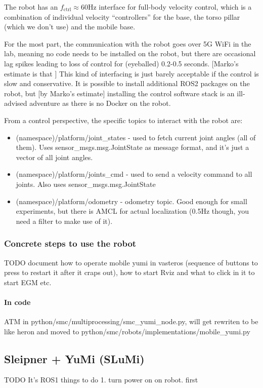 The robot has an $f_{ \text{ctrl} } \approx  $60Hz interface for full-body velocity control,
which is a combination of individual velocity ``controllers'' for the base, 
the torso pillar (which we don't use) and the mobile base.

For the most part, the communication with the robot goes over 5G WiFi in the lab,
meaning no code needs to be installed on the robot, but there are occasional lag spikes
leading to loss of control for (eyeballed) 0.2-0.5 seconds. 
[Marko's estimate is that ] This kind of interfacing is just barely acceptable
if the control is slow and conservative. It is possible to install additional ROS2
packages on the robot, but [by Marko's estimate] installing the control software stack
is an ill-advised adventure as there is no Docker on the robot.

From a control perspective,
the specific topics to interact with the robot are:
\begin{itemize}
		\item (namespace)/platform/joint\_states - used
				to fetch current joint angles (all of them).
				Uses sensor\_msgs.msg.JointState as message format,
				and it's just a vector of all joint angles.
		\item (namespace)/platform/joints\_cmd - used
				to send a velocity command to all 
				joints. Also uses  sensor\_msgs.msg.JointState
		\item (namespace)/platform/odometry - odometry topic.
				Good enough for small experiments,
				but there is AMCL for actual localization
				(0.5Hz though, you need a filter to make use of
				it).
\end{itemize}

\subsubsection{Concrete steps to use the robot}
TODO document how to operate mobile yumi in vasteros 
(sequence of buttons to press to restart it after it craps out),
how to start Rviz and what to click in it to start EGM etc.

\paragraph{In code}
ATM in python/smc/multiprocessing/smc\_yumi\_node.py,
will get rewriten to be like heron
and moved to python/smc/robots/implementations/mobile\_yumi.py

\subsection{Sleipner + YuMi (SLuMi)}
TODO
It's ROS1
things to do
1. turn power on on robot. first 
